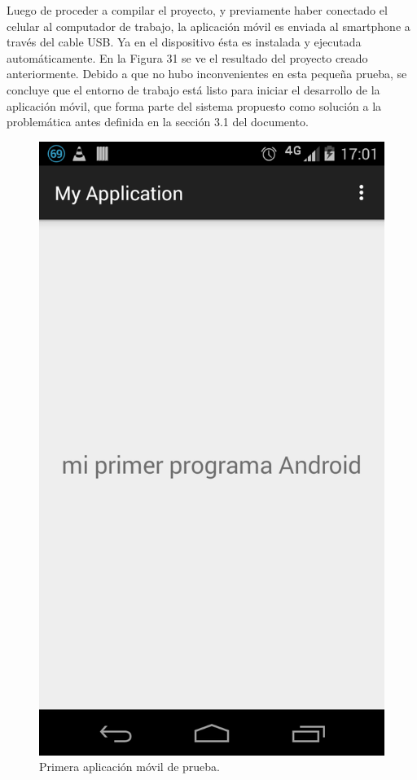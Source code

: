 Luego de proceder a compilar el proyecto, y previamente haber conectado el celular al computador de trabajo, la aplicación móvil es enviada al smartphone a través del cable USB. Ya en el dispositivo ésta es instalada y ejecutada automáticamente. En la Figura 31 se ve el resultado del proyecto creado anteriormente. Debido a que no hubo inconvenientes en esta pequeña prueba, se concluye que el entorno de trabajo está listo para iniciar el desarrollo de la aplicación móvil, que forma parte del sistema propuesto como solución a la problemática antes definida en la sección 3.1 del documento.\\

\begin{figure}[H]
\centering
\includegraphics[scale=0.25]{images/capitulo5/primeraAplicacion.png}
\caption{Primera aplicación móvil de prueba.}
\label{minSDK}
\end{figure}

